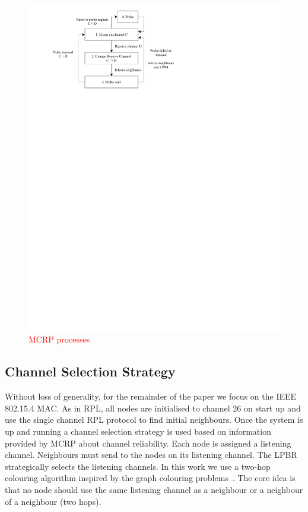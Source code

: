 \begin{figure}
\centering
\includegraphics[trim=2cm 20.5cm 9cm 0cm, clip=true, totalheight=0.2\textheight]{figures/MCRPprocesses.pdf}
\caption{\textcolor{red}{MCRP processes}}
\label{fig_mcrp}
\end{figure}

\subsection{Channel Selection Strategy}
Without loss of generality, for the remainder of the paper we focus on the IEEE 802.15.4 MAC. As in RPL, all nodes are initialised to channel 26 on start up and use the single channel RPL protocol to find initial neighbours.  Once the system is up and running a channel selection strategy is used based on information provided by MCRP about channel reliability.  Each node is assigned a listening channel.  Neighbours must send to the nodes on its listening channel.  The LPBR strategically selects the listening channels.  In this work we use a two-hop colouring algorithm inspired by the graph colouring problems~\cite{graphColouring}. The core idea is that no node should use the same listening channel as a neighbour or a neighbour of a neighbour (two hops).

